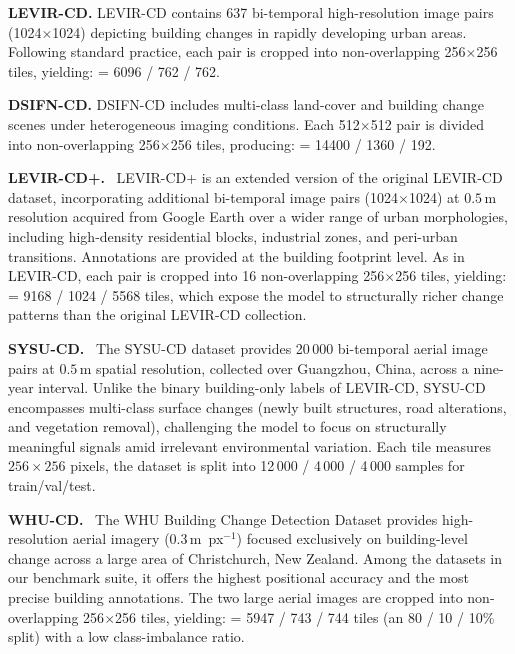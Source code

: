 \documentclass[runningheads]{llncs}
\newcommand{\journal}[1]{{\color{orange}#1}}
\begin{document}
\noindent \textbf{LEVIR-CD.} LEVIR-CD \cite{Zheng2020LEVIR} contains 637
bi-temporal high-resolution image pairs (1024$\times$1024) depicting building
changes in rapidly developing urban areas. Following standard practice, each
pair is cropped into non-overlapping 256$\times$256 tiles, yielding:
 = 6096 / 762 / 762.

\noindent \textbf{DSIFN-CD.} DSIFN-CD \cite{Zhang2020FusionNetDSIFN} includes
multi-class land-cover and building change scenes under heterogeneous imaging
conditions. Each 512$\times$512 pair is divided into non-overlapping
256$\times$256 tiles, producing:  = 14400 / 1360 / 192.


\journal{\noindent \textbf{LEVIR-CD+.}~\cite{Zheng2020LEVIR}
LEVIR-CD+ is an extended version of the original LEVIR-CD dataset, incorporating
additional bi-temporal image pairs (1024$\times$1024) at $0.5\,\mathrm{m}$
resolution acquired from Google Earth over a wider range of urban morphologies,
including high-density residential blocks, industrial zones, and peri-urban
transitions. Annotations are provided at the building footprint level. As in
LEVIR-CD, each pair is cropped into 16 non-overlapping 256$\times$256 tiles,
yielding: \text{Train/Val/Test} = 9168 / 1024 / 5568 tiles, which expose the
model to structurally richer change patterns than the original LEVIR-CD
collection.}

\journal{\noindent \textbf{SYSU-CD.}~\cite{ShiSYSU2022}
The SYSU-CD dataset provides 20\,000 bi-temporal aerial image pairs at
$0.5\,\mathrm{m}$ spatial resolution, collected over Guangzhou, China, across
a nine-year interval.
Unlike the binary building-only labels of LEVIR-CD, SYSU-CD encompasses
multi-class surface changes (newly built structures, road alterations,
and vegetation removal), challenging the model to focus on structurally
meaningful signals amid irrelevant environmental variation.
Each tile measures $256\times256$ pixels, the dataset is split into
12\,000 / 4\,000 / 4\,000 samples for train/val/test.}

\journal{\noindent \textbf{WHU-CD.}~\cite{Ji2019WHU}
The WHU Building Change Detection Dataset provides high-resolution aerial
imagery ($0.3\,\mathrm{m}$~px$^{-1}$) focused exclusively on building-level
change across a large area of Christchurch, New Zealand.
Among the datasets in our benchmark suite, it offers the highest positional
accuracy and the most precise building annotations. The two large aerial
images are cropped into non-overlapping 256$\times$256 tiles, yielding:
\text{Train/Val/Test} = 5947 / 743 / 744 tiles (an 80 / 10 / 10\% split) with
a low class-imbalance ratio.}
\end{document}
